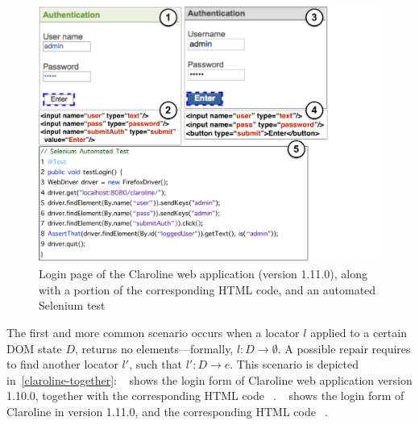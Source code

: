 
\begin{figure}[t]
\centering
\includegraphics[trim={0cm 0cm 5.5cm 0cm},clip,scale=0.275]{images/claroline-together}
\caption{Login page of the Claroline web application (version 1.11.0), along with a portion of the corresponding HTML code, and an automated Selenium test}
\label{claroline-together}
\end{figure}

The first and more common scenario occurs when a locator $l$ applied to a certain DOM state $D$, returns no elements---formally, $l: D \rightarrow \emptyset$. A possible repair requires to find another locator $l'$, such that $l': D \rightarrow e$.
This scenario is depicted in~\autoref{claroline-together}:~\textcircled{} shows the login form of Claroline web application version 1.10.0, together with the corresponding HTML code~\textcircled{}.~\textcircled{} shows the login form of Claroline in version 1.11.0, and the corresponding HTML code~\textcircled{}. 

